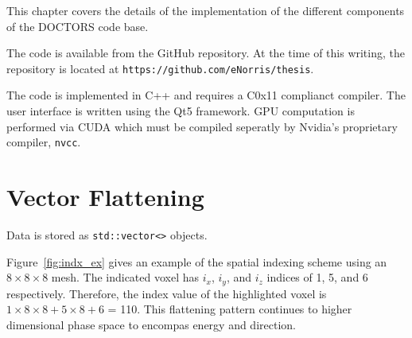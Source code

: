 


This chapter covers the details of the implementation of the different components of the DOCTORS code base.

The code is available from the GitHub repository. At the time of this writing, the repository is located at \texttt{https://github.com/eNorris/thesis}.

The code is implemented in C++ and requires a C0x11 complianct compiler. The user interface is written using the Qt5 framework. GPU computation is performed via CUDA which must be compiled seperatly by Nvidia's proprietary compiler, \texttt{nvcc}.

\section{Vector Flattening}

Data is stored as \texttt{std::vector<>} objects.

Figure~\ref{fig:indx_ex} gives an example of the spatial indexing scheme using an $8 \times 8 \times 8$ mesh. The indicated voxel has $i_x$, $i_y$, and $i_z$ indices of 1, 5, and 6 respectively. Therefore, the index value of the highlighted voxel is $1 \times 8 \times 8 + 5 \times 8 + 6$ = 110. This flattening pattern continues to higher dimensional phase space to encompas energy and direction.

